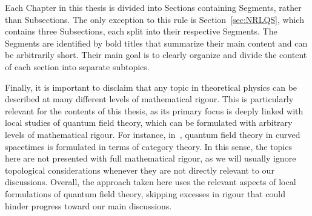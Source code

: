 \documentclass[letterpaper,12pt,titlepage,oneside,final]{book}
\begin{document}
Each Chapter in this thesis is divided into Sections containing Segments, rather than Subsections. The only exception to this rule is Section~\ref{sec:NRLQS}, which contains three Subsections, each split into their respective Segments. The Segments are identified by bold titles that summarize their main content and can be arbitrarily short. Their main goal is to clearly organize and divide the content of each section into separate subtopics. 

Finally, it is important to disclaim that any topic in theoretical physics can be described at many different levels of mathematical rigour. This is particularly relevant for the contents of this thesis, as its primary focus is deeply linked with local studies of quantum field theory, which can be formulated with arbitrary levels of mathematical rigour. For instance, in~\cite{FewsterCategory}, quantum field theory in curved spacetimes is formulated in terms of category theory. In this sense, the topics here are not presented with full mathematical rigour, as we will usually ignore topological considerations whenever they are not directly relevant to our discussions. Overall, the approach taken here uses the relevant aspects of local formulations of quantum field theory, skipping excesses in rigour that could hinder progress toward our main discussions.




\end{document}
